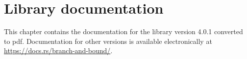 \appendix

\chapter{Library documentation}
\label{appex:libdoc}

This chapter contains the documentation for the library version 4.0.1 converted to pdf.
Documentation for other versions is available electronically at
\url{https://docs.rs/branch-and-bound/}.












